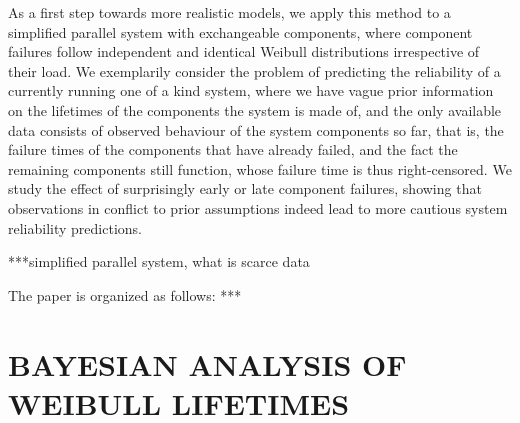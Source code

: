 \documentclass[12pt,a4paper,twocolumn,fleqn]{narms}
\begin{document}
As a first step towards more realistic models, we apply this method
to a simplified parallel system with exchangeable components,
where component failures follow independent and identical Weibull distributions irrespective of their load.
We exemplarily consider the problem of predicting the reliability of a currently running one of a kind system,
where we have vague prior information on the lifetimes of the components the system is made of,
and the only available data consists of observed behaviour of the system components so far,
that is, the failure times of the components that have already failed,
and the fact the remaining components still function,
whose failure time is thus right-censored.
We study the effect of surprisingly early or late component failures,
showing that observations in conflict to prior assumptions
indeed lead to more cautious system reliability predictions.

***simplified parallel system, what is scarce data

The paper is organized as follows: *** 


\section{BAYESIAN ANALYSIS OF WEIBULL LIFETIMES}
\label{sec:weibull}
\end{document}
